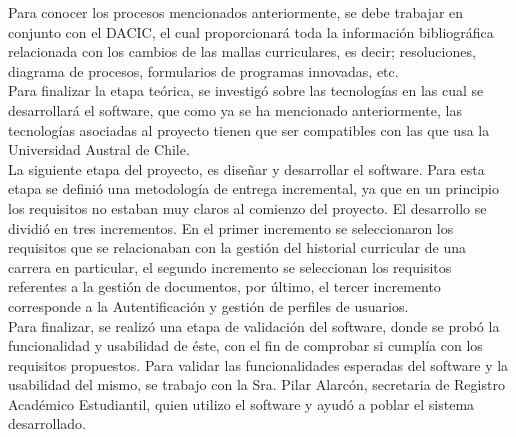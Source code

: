 Para conocer los procesos mencionados anteriormente, se debe trabajar en conjunto con el DACIC, el cual proporcionará toda la información bibliográfica relacionada con los cambios de las mallas curriculares, es decir; resoluciones, diagrama de procesos, formularios de programas innovadas, etc.
\\

Para finalizar la etapa teórica, se investigó sobre las tecnologías en las cual se desarrollará el software, que como ya se ha mencionado anteriormente, las tecnologías asociadas al proyecto tienen que ser compatibles con las que usa la Universidad Austral de Chile.
\\


La siguiente etapa del proyecto, es diseñar y desarrollar el software. Para esta etapa se definió una metodología de entrega incremental, ya que en un principio los requisitos no estaban muy claros al comienzo del proyecto. El desarrollo se dividió en tres incrementos. En el primer incremento se seleccionaron los requisitos que se relacionaban con la gestión del historial curricular de una carrera en particular,  el segundo incremento se seleccionan los requisitos referentes a la gestión de documentos, por último, el tercer incremento  corresponde a la Autentificación y gestión de perfiles de usuarios.
\\

Para finalizar, se realizó una etapa de validación del software, donde se probó la funcionalidad y usabilidad de éste, con el fin de comprobar si cumplía con los requisitos propuestos. Para validar las funcionalidades esperadas del software y la usabilidad del mismo, se trabajo con la Sra. Pilar Alarcón, secretaria de Registro Académico Estudiantil, quien utilizo el software y ayudó a poblar el sistema desarrollado.

